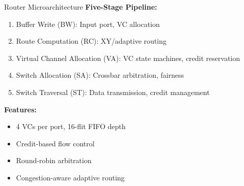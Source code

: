 \documentclass{beamer}
\begin{document}
\begin{frame}{Router Microarchitecture}
  \textbf{Five-Stage Pipeline:}
  \begin{enumerate}
    \item Buffer Write (BW): Input port, VC allocation
    \item Route Computation (RC): XY/adaptive routing
    \item Virtual Channel Allocation (VA): VC state machines, credit reservation
    \item Switch Allocation (SA): Crossbar arbitration, fairness
    \item Switch Traversal (ST): Data transmission, credit management
  \end{enumerate}
  \vspace{0.5em}
  \textbf{Features:}
  \begin{itemize}
    \item 4 VCs per port, 16-flit FIFO depth
    \item Credit-based flow control
    \item Round-robin arbitration
    \item Congestion-aware adaptive routing
  \end{itemize}
\end{frame}
\end{document}
